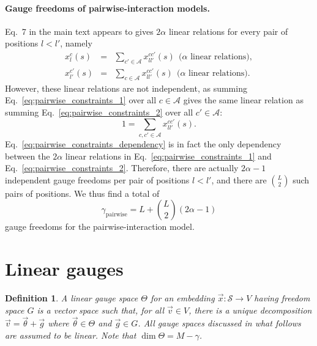 \documentclass{article}
\numberwithin{myclaim}{section}
\newcommand{\eq}[1]{Eq.\ \ref{#1}}
\newtheorem{definition}{Definition}
\begin{document}
\paragraph*{Gauge freedoms of pairwise-interaction models.}
Eq.\ 7 in the main text appears to gives $2 \alpha$ linear relations for every pair of positions $l < l'$, namely
\begin{eqnarray}
    x_l^c(s) &=& \sum_{c' \in \mathcal{A}} x_{l l'}^{c c'}(s) ~~\textrm{($\alpha$ linear relations)} \label{eq:pairwise_constraints_1}, \\
    x_{l'}^{c'}(s) &=& \sum_{c \in \mathcal{A}} x_{l l'}^{c c'}(s)~~\textrm{($\alpha$ linear relations)} \label{eq:pairwise_constraints_2}.
\end{eqnarray}
However, these linear relations are not independent, as summing \eq{eq:pairwise_constraints_1} over all $c \in \mathcal{A}$ gives the same linear relation as summing \eq{eq:pairwise_constraints_2} over all $c' \in \mathcal{A}$:
\begin{equation}
   1 = \sum_{c,c' \in \mathcal{A}} x_{l l'}^{c c'}(s). \label{eq:pairwise_constraints_dependency}
\end{equation}
\eq{eq:pairwise_constraints_dependency} is in fact the only dependency between the $2 \alpha$ linear relations in \eq{eq:pairwise_constraints_1} and \eq{eq:pairwise_constraints_2}. Therefore, there are actually $2 \alpha - 1$ independent gauge freedoms per pair of positions $l < l'$, and there are ${L \choose 2}$ such pairs of positions. We thus find a total of 
\begin{equation}
    \gamma_\textrm{pairwise} = L + {L \choose 2} (2 \alpha - 1)
\end{equation}
gauge freedoms for the pairwise-interaction model.

\section{Linear gauges}

\begin{definition} \label{def:gauge_space}
A linear gauge space $\Theta$ for an embedding $\vec{x}:\mathcal{S} \to V$ having freedom space $G$ is a vector space such that, for all $\vec{v} \in V$, there is a unique decomposition $\vec{v} = \vec{\theta} + \vec{g}$ where $\vec{\theta} \in \Theta$ and $\vec{g} \in G$. All gauge spaces discussed in what follows are assumed to be linear. Note that $\dim \Theta = M - \gamma$.
\end{definition}
\end{document}
